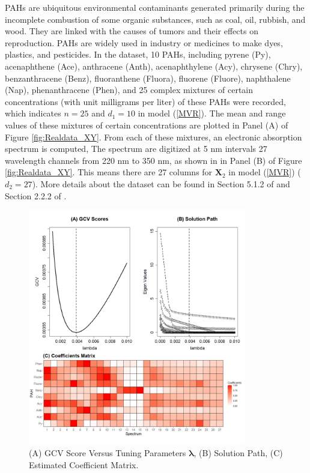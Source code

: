 \documentclass[alpha-refs]{wiley-article}
\begin{document}
PAHs are ubiquitous environmental contaminants generated primarily during the incomplete combustion of some organic substances, such as coal, oil, rubbish, and wood. They are linked with the causes of tumors and their effects on reproduction. PAHs are widely used in industry or medicines to make dyes, plastics, and pesticides. In the dataset, 10 PAHs, including pyrene (Py), acenaphthene (Ace), anthracene (Anth), acenaphthylene (Acy), chrysene (Chry), benzanthracene (Benz), fluoranthene (Fluora), fluorene (Fluore), naphthalene (Nap), phenanthracene (Phen), and 25 complex mixtures of certain concentrations (with unit milligrams per liter) of these PAHs were recorded, which indicates $n = 25$ and $d_{1} = 10$ in model (\ref{MVR}). The mean and range values of these mixtures of certain concentrations are plotted in Panel (A) of Figure \ref{fig:Realdata_XY}.
From each of these mixtures, an electronic absorption spectrum is computed, The spectrum are digitized at 5 nm intervals 27 wavelength channels from 220 nm to 350 nm, as shown in in Panel (B) of Figure \ref{fig:Realdata_XY}.  This means there are 27 columns for $\boldsymbol{X}_{2}$ in model (\ref{MVR}) ($d_{2}  = 27$). More details about the dataset can be found in Section 5.1.2 of \citet{brereton2003chemometrics} and Section 2.2.2 of \citet{isenmann2008modern}.

\begin{figure}[hbt!]
    \centering
    \includegraphics[width = 95mm]{Figure/S6_P2.pdf}
    \caption{(A) GCV Score Versus Tuning Parameters $\boldsymbol{\lambda}$, (B) Solution Path, (C) Estimated Coefficient Matrix.}
    \label{fig:Realdata_GCV}
\end{figure}
\end{document}
